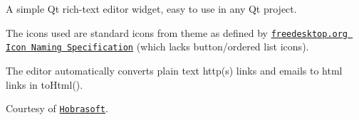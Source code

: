 A simple Qt rich-\/text editor widget, easy to use in any Qt project.



The icons used are standard icons from theme as defined by \href{http://standards.freedesktop.org/icon-naming-spec/icon-naming-spec-latest.html}{\tt freedesktop.\+org Icon Naming Specification} (which lacks button/ordered list icons).

The editor automatically converts plain text http(s) links and emails to html links in to\+Html().

Courtesy of \href{http://www.hobrasoft.cz/}{\tt Hobrasoft}. 
